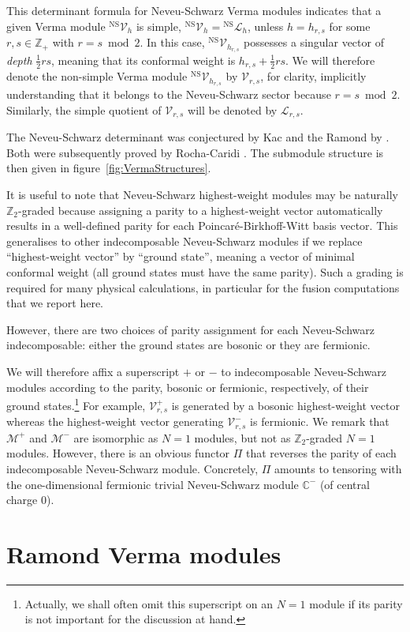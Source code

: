 \documentclass[a4paper,reqno,12pt]{report}
\theoremstyle{definition}
\numberwithin{equation}{section}
\newcommand{\ZZ}{\mathbb{Z}}
\newcommand{\CC}{\mathbb{C}}
\newcommand{\Ver}[1]{\mathcal{V}_{#1}}       %
\newcommand{\Irr}[1]{\mathcal{L}_{#1}}       %
\newcommand{\hw}{highest-weight}
\newcommand{\sv}{singular vector}
\newcommand{\hwms}{\hw{} modules}
\newcommand{\ns}{Neveu-Schwarz}
\theoremstyle{plain}
\newcommand{\hwv}{\hw{} vector}
\newcommand{\NSVer}[1]{{}^{\text{NS}}\Ver{#1}}     %
\newcommand{\Mod}[1]{\mathcal{#1}}                 %
\newcommand{\NSIrr}[1]{{}^{\text{NS}}\Irr{#1}}     %
\newcommand{\PBW}{Poincar\'{e}-Birkhoff-Witt}
\begin{document}
This determinant formula \cite{KacCon79,MeuHig86} for \ns{} Verma modules indicates that a given Verma module $\NSVer{h}$ is simple, $\NSVer{h} = \NSIrr{h}$, unless $h = h_{r,s}$ for some $r,s \in \ZZ_+$ with $r=s \bmod{2}$.  In this case, $\NSVer{h_{r,s}}$ possesses a \sv{} of \emph{depth} $\frac{1}{2} rs$, meaning that its conformal weight is $h_{r,s} + \frac{1}{2} rs$.  We will therefore denote the non-simple Verma module $\NSVer{h_{r,s}}$ by $\Ver{r,s}$, for clarity, implicitly understanding that it belongs to the \ns{} sector because $r=s \bmod{2}$.  Similarly, the simple quotient of $\Ver{r,s}$ will be denoted by $\Irr{r,s}$.

The Neveu-Schwarz determinant was conjectured by Kac \cite{KacContForm79} and the Ramond by \cite{FriSup85}. Both were subsequently proved by Rocha-Caridi \cite{RochNS86}. The submodule structure is then given in figure~\ref{fig:VermaStructures}.

It is useful to note that \ns{} \hwms{} may be naturally $\ZZ_2$-graded because assigning a parity to a \hwv{} automatically results in a well-defined parity for each \PBW{} basis vector.  This generalises to other indecomposable \ns{} modules if we replace ``\hwv{}'' by ``ground state'', meaning a vector of minimal conformal weight (all ground states must have the same parity).  Such a grading is required for many physical calculations, in particular for the fusion computations that we report here. 

However, there are two choices of parity assignment for each \ns{} indecomposable:  either the ground states are bosonic or they are fermionic.

We will therefore affix a superscript $+$ or $-$ to indecomposable \ns{} modules according to the parity, bosonic or fermionic, respectively, of their ground states.\footnote{Actually, we shall often omit this superscript on an $N=1$ module if its parity is not important for the discussion at hand.}  For example, $\Ver{r,s}^+$ is generated by a bosonic \hwv{} whereas the \hwv{} generating $\Ver{r,s}^-$ is fermionic.  We remark that $\Mod{M}^+$ and $\Mod{M}^-$ are isomorphic as $N=1$ modules, but not as $\ZZ_2$-graded $N=1$ modules.  However, there is an obvious functor $\Pi$ that reverses the parity of each indecomposable \ns{} module.  Concretely, $\Pi$ amounts to tensoring with the one-dimensional fermionic trivial \ns{} module $\CC^-$ (of central charge $0$).

\section{Ramond Verma modules}
\end{document}
